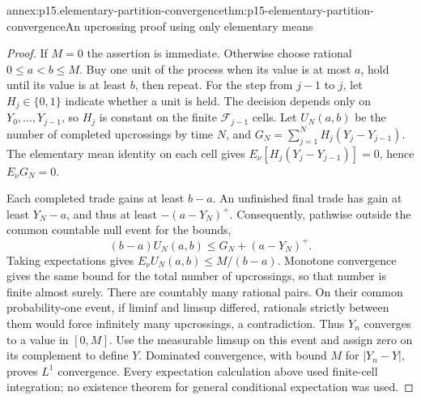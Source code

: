 \begin{annexitem}{annex:p15.elementary-partition-convergence}{thm:p15-elementary-partition-convergence}{An upcrossing proof using only elementary means}
\begin{proof}
If \(M=0\) the assertion is immediate. Otherwise choose rational
\(0\leq a<b\leq M\). Buy one unit of the process when its value is
at most \(a\), hold until its value is at least \(b\), then repeat.
For the step from \(j-1\) to \(j\), let \(H_j\in\{0,1\}\)
indicate whether a unit is held. The decision depends only on
\(Y_0,\ldots,Y_{j-1}\), so \(H_j\) is constant on the finite
\(\mathcal F_{j-1}\) cells. Let \(U_N(a,b)\) be the number of
completed upcrossings by time \(N\), and
\(G_N=\sum_{j=1}^NH_j(Y_j-Y_{j-1})\).
The elementary mean identity on each cell gives
\(E_\nu[H_j(Y_j-Y_{j-1})]=0\), hence \(E_\nu G_N=0\).

Each completed trade gains at least \(b-a\).
An unfinished final trade has gain at least \(Y_N-a\), and thus
at least \(-(a-Y_N)^+\). Consequently, pathwise outside the common
countable null event for the bounds,
\[
              (b-a)U_N(a,b)\leq G_N+(a-Y_N)^+.
\]
Taking expectations gives \(E_\nu U_N(a,b)\leq M/(b-a)\).
Monotone convergence gives the same bound for the total number of
upcrossings, so that number is finite almost surely.
There are countably many rational pairs. On their common
probability-one event, if liminf and limsup differed, rationals
strictly between them would force infinitely many upcrossings,
a contradiction. Thus \(Y_n\) converges to a value in \([0,M]\).
Use the measurable limsup on this event and assign zero on its
complement to define \(Y\). Dominated convergence, with bound \(M\)
for \(|Y_n-Y|\), proves \(L^1\) convergence.
Every expectation calculation above used finite-cell integration;
no existence theorem for general conditional expectation was used.
\end{proof}
\end{annexitem}

